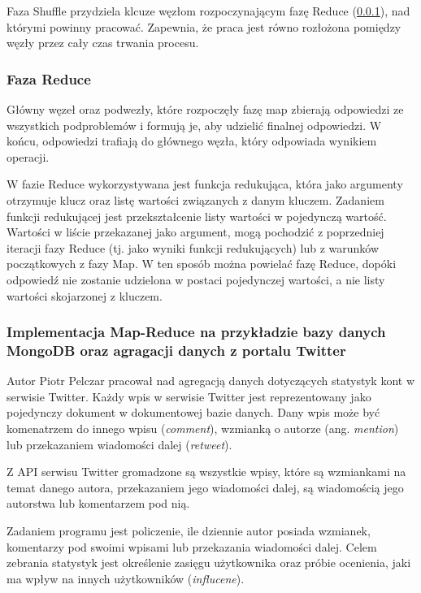 Faza Shuffle przydziela klcuze węzłom rozpoczynającym fazę Reduce (\ref{sec:mapreduce-reduce}), nad którymi powinny 
pracować. Zapewnia, że praca jest równo rozłożona pomiędzy węzły przez cały czas trwania procesu.

\subsubsection{Faza Reduce}
\label{sec:mapreduce-reduce}

Główny węzeł oraz podwezły, które rozpoczęły fazę map zbierają odpowiedzi ze wszystkich podproblemów i formują je, aby udzielić finalnej odpowiedzi. W końcu, odpowiedzi trafiają do głównego węzła, który odpowiada wynikiem operacji.

W fazie Reduce wykorzystywana jest funkcja redukująca, która jako argumenty otrzymuje klucz oraz listę wartości związanych z danym kluczem. Zadaniem funkcji redukującej jest przekształcenie listy wartości w pojedynczą wartość. Wartości w liście przekazanej jako argument, mogą pochodzić z poprzedniej iteracji fazy Reduce (tj. jako wyniki funkcji redukujących) lub z warunków początkowych z fazy Map. W ten sposób można powielać fazę Reduce, dopóki odpowiedź nie zostanie udzielona w postaci pojedynczej wartości, a nie listy wartości skojarzonej z kluczem.

\subsubsection{Implementacja Map-Reduce na przykładzie bazy danych MongoDB oraz agragacji danych z portalu Twitter}
\label{sec:mapreduce-implementation-twitter}

Autor Piotr Pelczar pracował nad agregacją danych dotyczących statystyk kont w serwisie Twitter. Każdy wpis w serwisie Twitter jest reprezentowany jako pojedynczy dokument w dokumentowej bazie danych. Dany wpis może być komenatrzem do innego wpisu (\emph{comment}), wzmianką o autorze (ang. \emph{mention}) lub przekazaniem wiadomości dalej (\emph{retweet}).

Z API serwisu Twitter gromadzone są wszystkie wpisy, które są wzmiankami na temat danego autora, przekazaniem jego wiadomości dalej, są wiadomością jego autorstwa lub komentarzem pod nią.

Zadaniem programu jest policzenie, ile dziennie autor posiada wzmianek, komentarzy pod swoimi wpisami lub przekazania wiadomości dalej. Celem zebrania statystyk jest określenie zasięgu użytkownika oraz próbie ocenienia, jaki ma wpływ na innych użytkowników (\emph{influcene}).

